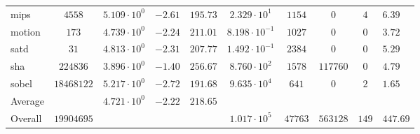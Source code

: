 \begin{tabular}{|l|c|HHc|c|c|c|cH|}
mips          & $ 4558     $ & $ 5.109 \cdot 10^{0} $ & $ -2.61 $ & $ 195.73 $ & $ 2.329 \cdot 10^{1}  $ & $ 1154  $ & $ 0      $ & $ 4   $ & $ 6.39    $ \\
motion        & $ 173      $ & $ 4.739 \cdot 10^{0} $ & $ -2.24 $ & $ 211.01 $ & $ 8.198 \cdot 10^{-1} $ & $ 1027  $ & $ 0      $ & $ 0   $ & $ 3.72    $ \\
satd          & $ 31       $ & $ 4.813 \cdot 10^{0} $ & $ -2.31 $ & $ 207.77 $ & $ 1.492 \cdot 10^{-1} $ & $ 2384  $ & $ 0      $ & $ 0   $ & $ 5.29    $ \\
sha           & $ 224836   $ & $ 3.896 \cdot 10^{0} $ & $ -1.40 $ & $ 256.67 $ & $ 8.760 \cdot 10^{2}  $ & $ 1578  $ & $ 117760 $ & $ 0   $ & $ 4.79    $ \\
sobel         & $ 18468122 $ & $ 5.217 \cdot 10^{0} $ & $ -2.72 $ & $ 191.68 $ & $ 9.635 \cdot 10^{4}  $ & $ 641   $ & $ 0      $ & $ 2   $ & $ 1.65    $ \\
\hline
Average       & $          $ & $ 4.721 \cdot 10^{0} $ & $ -2.22 $ & $ 218.65 $ & $                     $ & $       $ & $        $ & $     $ & $         $ \\
\hline
Overall       & $ 19904695 $ & $                    $ & $       $ & $        $ & $ 1.017 \cdot 10^{5}  $ & $ 47763 $ & $ 563128 $ & $ 149 $ & $ 447.69  $ \\
\hline
\end{tabular}
